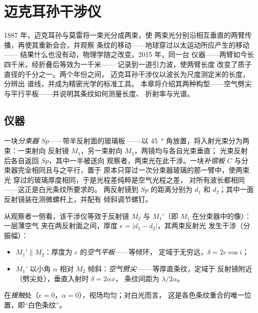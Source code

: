 \chapter{迈克耳孙干涉仪}\label{ch:b2:michelson}

1887 年，迈克耳孙与莫雷将一束光分成两束，使
两束光分别沿相互垂直的两臂传播，再使其重新会合，并观察
条纹的移动——地球穿过以太运动所应产生的移动——
结果什么也没有动，物理学随之改变。2015 年，同一台
仪器——两臂如今长四千米，经折叠后等效为一千米——
记录到一道引力波，使两臂长度
改变了质子直径的千分之一。两个年份之间，
迈克耳孙干涉仪以波长为尺度测定米的长度，分辨出
谱线，并成为精密光学的标准工具。
本章将介绍其两种构型——空气劈尖
与平行平板——并说明其条纹如何测量长度、
折射率与光谱。

\section{仪器}

\begin{definition}[迈克耳孙干涉仪]\label{def:b2:michelson:instrument}
一块\emph{分束器} $Sp$——带半反射面的玻璃板
——以 \qty{45}{\degree} 角放置，将入射光束分为两束：一束射向
反射镜 $M_1$，另一束射向 $M_2$，两镜均与各自光束垂直；
光束反射后各自返回 $Sp$，其中一半被送向
观察者，两束光在此干涉。一块\emph{补偿板}
$C$ 与分束器完全相同且与之平行，置于
原本只穿过一次分束器玻璃的那一臂中，使两束光
穿过的玻璃厚度相同，于是光程差纯粹是空气光程之差，
对所有波长都相同——这正是白光条纹所要求的。
两反射镜到 $Sp$ 的距离分别为 $d_1$
和 $d_2$；其中一面反射镜装在测微螺杆上，并配有
倾斜调节螺钉。
\end{definition}

\begin{proposition}[等效装置]\label{prop:b2:michelson:equivalent}
从观察者一侧看，该干涉仪等效于反射镜
$M_2$ 与 $M_1'$（即 $M_1$ 在分束器中的像）：一层薄空气
夹在两反射面之间，厚度 $e = |d_1 - d_2|$，其两束反射光
发生干涉（分振幅）：
\begin{itemize}
  \item $M_1' \parallel M_2$：厚度为 $e$ 的\emph{空气平板}——等倾环，
        定域于无穷远，$\delta = 2e\cos i$；
  \item $M_1'$ 以小角 $\alpha$ 相对 $M_2$ 倾斜：\emph{空气劈尖}
——等厚直条纹，定域于
        反射镜附近（劈尖处），垂直入射时 $\delta = 2\alpha x$，
        条纹间距为 $\lambda/2\alpha$。
\end{itemize}
在\emph{接触}处（$e = 0$，$\alpha = 0$），视场均匀；对白光而言，
这是各色条纹重合的唯一位置，即“白色条纹”。
\end{proposition}

